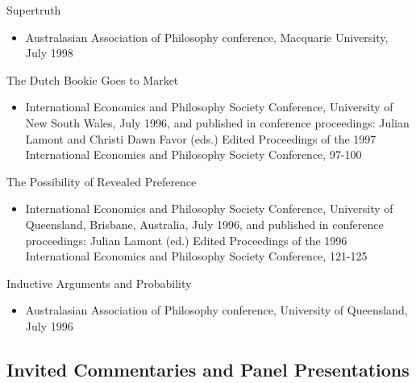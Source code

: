 \documentclass[
  10pt,
  letterpaper,
  DIV=11,
  numbers=noendperiod,
  twoside]{scrartcl}
\providecommand{\tightlist}{%
  \setlength{\itemsep}{0pt}\setlength{\parskip}{0pt}}
\begin{document}
Supertruth

\begin{itemize}
\tightlist
\item
  Australasian Association of Philosophy conference, Macquarie
  University, July 1998
\end{itemize}

The Dutch Bookie Goes to Market

\begin{itemize}
\tightlist
\item
  International Economics and Philosophy Society Conference, University
  of New South Wales, July 1996, and published in conference
  proceedings: Julian Lamont and Christi Dawn Favor (eds.) Edited
  Proceedings of the 1997 International Economics and Philosophy Society
  Conference, 97-100
\end{itemize}

The Possibility of Revealed Preference

\begin{itemize}
\tightlist
\item
  International Economics and Philosophy Society Conference, University
  of Queensland, Brisbane, Australia, July 1996, and published in
  conference proceedings: Julian Lamont (ed.) Edited Proceedings of the
  1996 International Economics and Philosophy Society Conference,
  121-125
\end{itemize}

\newpage

Inductive Arguments and Probability

\begin{itemize}
\tightlist
\item
  Australasian Association of Philosophy conference, University of
  Queensland, July 1996
\end{itemize}

\subsection{Invited Commentaries and Panel
Presentations}\label{invited-commentaries-and-panel-presentations}
\end{document}
